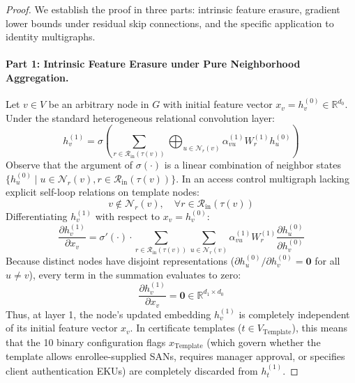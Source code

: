 \begin{proof}
We establish the proof in three parts: intrinsic feature erasure, gradient lower bounds under residual skip connections, and the specific application to identity multigraphs.

\paragraph{Part 1: Intrinsic Feature Erasure under Pure Neighborhood Aggregation.}
Let $v \in V$ be an arbitrary node in $G$ with initial feature vector $x_v = h_v^{(0)} \in \mathbb{R}^{d_0}$. Under the standard heterogeneous relational convolution layer:
\begin{equation}
h_v^{(1)} = \sigma \left( \sum_{r \in \mathcal{R}_{\text{in}}(\tau(v))} \bigoplus_{u \in \mathcal{N}_r(v)} \alpha_{vu}^{(1)} W_r^{(1)} h_u^{(0)} \right)
\end{equation}
Observe that the argument of $\sigma(\cdot)$ is a linear combination of neighbor states $\{h_u^{(0)} \mid u \in \mathcal{N}_r(v), r \in \mathcal{R}_{\text{in}}(\tau(v))\}$. In an access control multigraph lacking explicit self-loop relations on template nodes:
\begin{equation}
v \notin \mathcal{N}_r(v), \quad \forall r \in \mathcal{R}_{\text{in}}(\tau(v))
\end{equation}
Differentiating $h_v^{(1)}$ with respect to $x_v = h_v^{(0)}$:
\begin{equation}
\frac{\partial h_v^{(1)}}{\partial x_v} = \sigma'(\cdot) \cdot \sum_{r \in \mathcal{R}_{\text{in}}(\tau(v))} \sum_{u \in \mathcal{N}_r(v)} \alpha_{vu}^{(1)} W_r^{(1)} \frac{\partial h_u^{(0)}}{\partial h_v^{(0)}}
\end{equation}
Because distinct nodes have disjoint representations ($\partial h_u^{(0)} / \partial h_v^{(0)} = \mathbf{0}$ for all $u \neq v$), every term in the summation evaluates to zero:
\begin{equation}
\frac{\partial h_v^{(1)}}{\partial x_v} = \mathbf{0} \in \mathbb{R}^{d_1 \times d_0}
\end{equation}
Thus, at layer 1, the node's updated embedding $h_v^{(1)}$ is completely independent of its initial feature vector $x_v$. In certificate templates ($t \in V_{\text{Template}}$), this means that the 10 binary configuration flags $x_{\text{Template}}$ (which govern whether the template allows enrollee-supplied SANs, requires manager approval, or specifies client authentication EKUs) are completely discarded from $h_t^{(1)}$. 


\end{proof}
